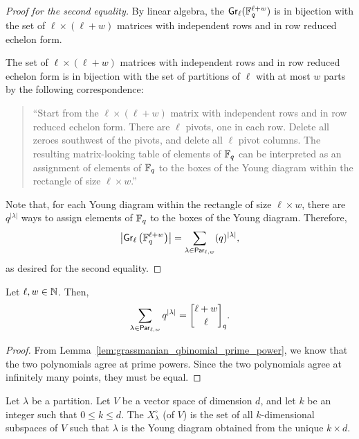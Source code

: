 \begin{proof}[Proof for the second equality]
    By linear algebra, the \(\operatorname{\mathsf{Gr}}_\ell(\mathbb{F}_{q}^{\ell + w})\) is in bijection with the set of \(\ell \times (\ell + w)\) matrices with independent rows and in row reduced echelon form.

    The set of \(\ell \times (\ell + w)\) matrices with independent rows and in row reduced echelon form is in bijection with the set of partitions of \(\ell\) with at most \(w\) parts by the following correspondence:
    \begin{quote}
        ``Start from the \(\ell \times (\ell + w)\) matrix with independent rows and in row reduced echelon form.
        There are \(\ell\) pivots, one in each row.
        Delete all zeroes southwest of the pivots, and delete all \(\ell\) pivot columns.
        The resulting matrix-looking table of elements of \(\mathbb{F}_{q}\) can be interpreted as an assignment of elements of \(\mathbb{F}_{q}\) to the boxes of the Young diagram within the rectangle of size \(\ell \times w\).''
    \end{quote}

    Note that, for each Young diagram within the rectangle of size \(\ell \times w\), there are \(q^{|\lambda|}\) ways to assign elements of \(\mathbb{F}_{q}\) to the boxes of the Young diagram.
    Therefore,
    \[
        \left|
            \operatorname{\mathsf{Gr}}_\ell\left(\mathbb{F}_{q}^{\ell + w} \right)
        \right|
        = \sum_{\lambda \in \operatorname{\mathsf{Par}}_{\ell, w}} (q)^{|\lambda|},
    \]
    as desired for the second equality.
\end{proof}

\begin{theorem}
    Let \(\ell, w \in \mathbb{N}\).
    Then,
    \[
        \sum_{\lambda \in \Par_{\ell, w}} q^{|\lambda|}
        = \qbinom{\ell + w}{\ell}.
    \]
\end{theorem}

\begin{proof}
    From Lemma~\ref{lem:grassmanian_qbinomial_prime_power},
    we know that the two polynomials agree at prime powers.
    Since the two polynomials agree at infinitely many points,
    they must be equal.
\end{proof}

\begin{definition}
    Let \(\lambda\) be a partition.
    Let \(V\) be a vector space of dimension \(d\), and let \(k\) be an integer such that \(0 \leq k \leq d\).
    The  \(X^\circ_\lambda\) (of \(V\)) is the set of all \(k\)-dimensional subspaces of \(V\) such that \(\lambda\) is the Young diagram obtained from the unique \(k \times d\).
\end{definition}